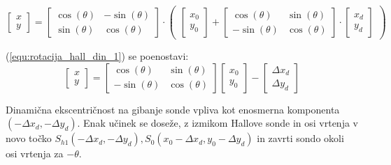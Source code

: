\begin{equation}
\label{equ:rotacija_hall_din_1}
\begin{bmatrix} x\\y \end{bmatrix}=
\begin{bmatrix} \cos(\theta)&-\sin(\theta)\\ \sin(\theta)&\cos(\theta) \end{bmatrix}
\cdot \begin{pmatrix}
\begin{bmatrix} x_0\\y_0 \end{bmatrix}+
\begin{bmatrix} \cos(\theta)&\sin(\theta)\\-\sin(\theta)&\cos(\theta) \end{bmatrix}\cdot
\begin{bmatrix} x_d\\y_d \end{bmatrix}\end{pmatrix}
\end{equation}

(\ref{equ:rotacija_hall_din_1}) se poenostavi:
\begin{equation}
\label{equ:rotacija_hall_din}
\begin{bmatrix} x\\y \end{bmatrix}=
\begin{bmatrix} \cos(\theta)&\sin(\theta)\\-\sin(\theta)&\cos(\theta) \end{bmatrix}
\begin{bmatrix} x_0\\y_0 \end{bmatrix}
-
\begin{bmatrix} \Delta x_d\\\Delta y_d \end{bmatrix}
\end{equation}

Dinamična ekscentričnost na gibanje sonde vpliva kot enosmerna komponenta  $(-\Delta x_d,-\Delta y_d)$. Enak učinek se doseže, z izmikom Hallove sonde in osi vrtenja v novo točko $S_{h1}(-\Delta x_d,-\Delta y_d), S_0(x_0-\Delta x_d,y_0-\Delta y_d)$  in zavrti sondo okoli osi vrtenja za  $-\theta$. 


